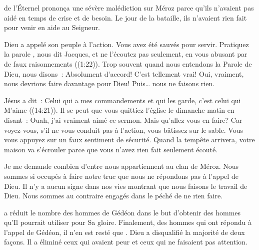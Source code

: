  de l'Éternel prononça une sévère malédiction sur Méroz
 parce qu'ils n'avaient pas aidé en temps de crise et de besoin.
 Le jour de la bataille, ils n'avaient rien fait pour venir en aide au Seigneur.

Dieu a appelé son peuple à l'action. Vous avez été sauvés pour servir.
 \og Pratiquez la parole \fg{},  nous dit Jacques,
 \og et ne l'écoutez pas seulement,
 en vous abusant par de faux raisonnements \fg{} ((1:22)).
 Trop souvent quand nous entendons la Parole de Dieu, nous disons~:
 \og Absolument d'accord! C'est tellement vrai!
 Oui, vraiment, nous devrions faire davantage pour Dieu! \fg{}
 Puis\dots{} nous ne faisons rien.


Jésus a dit~:
 \og Celui qui a mes commandements et qui les garde,
 c'est celui qui M'aime \fg{} ((14:21)).
 Il se peut que vous quittiez l'église le dimanche matin en disant~:
 \og Ouah, j'ai vraiment aimé ce sermon. \fg{}
 Mais qu'allez-vous en faire? Car voyez-vous, s'il ne vous conduit pas
 à l'action, vous bâtissez sur le sable.
 Vous vous appuyez sur un faux sentiment de sécurité.
 Quand la tempête arrivera, votre maison va s'écrouler
 parce que vous n'avez rien fait \ocadr seulement écouté.

Je me demande combien d'entre nous appartiennent au clan de Méroz.
 Nous sommes si occupés à faire \og notre truc \fg{} que nous ne répondons pas
 à l'appel de Dieu. Il n'y a aucun signe dans nos vies montrant
 que nous faisons le travail de Dieu.
 Nous sommes au contraire engagés dans le péché de ne rien faire. 

\dvrule







 a réduit le nombre des hommes de Gédéon
 dans le but d'obtenir des hommes qu'Il pourrait utiliser pour Sa gloire.
 Finalement, des  hommes qui ont répondu à l'appel de Gédéon,
 il n'en est resté que .
 Dieu a disqualifié la majorité de deux façons.
 Il a éliminé ceux qui avaient peur et ceux qui ne faisaient pas attention.

